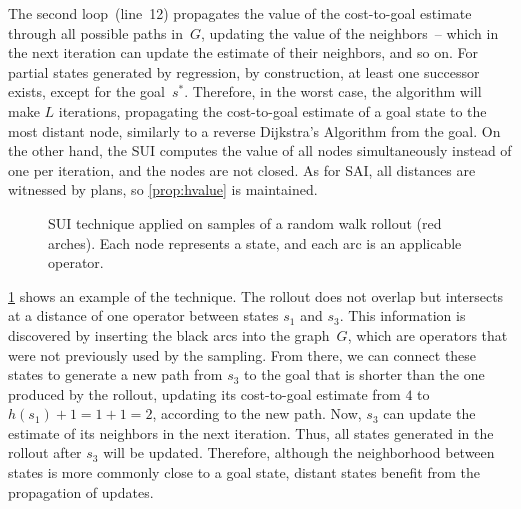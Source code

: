 The second loop~(line~12) propagates the value of the cost-to-goal estimate through all possible paths in~$G$, updating the value of the neighbors~-- which in the next iteration can update the estimate of their neighbors, and so on. For partial states generated by regression, by construction, at least one successor exists, except for the goal~$s^*$. Therefore, in the worst case, the algorithm will make $L$ iterations, propagating the cost-to-goal estimate of a goal state to the most distant node, similarly to a reverse Dijkstra's Algorithm from the goal. On the other hand, the SUI computes the value of all nodes simultaneously instead of one per iteration, and the nodes are not closed. As for SAI, all distances are witnessed by plans, so \cref{prop:hvalue} is maintained.

\begin{figure}[tb]
    \caption[SUI technique applied to samples of a random walk rollout.]{SUI technique applied on samples of a random walk rollout (red arches). Each node represents a state, and each arc is an applicable operator.}
    \label{fig:sui}
    \addmargin
    \centering
    
\end{figure}

\cref{fig:sui} shows an example of the technique. The rollout does not overlap but intersects at a distance of one operator between states $s_1$ and $s_3$. This information is discovered by inserting the black arcs into the graph~$G$, which are operators that were not previously used by the sampling. From there, we can connect these states to generate a new path from $s_3$ to the goal that is shorter than the one produced by the rollout, updating its cost-to-goal estimate from $4$ to $h(s_1)+1=1+1=2$, according to the new path. Now, $s_3$ can update the estimate of its neighbors in the next iteration. Thus, all states generated in the rollout after $s_3$ will be updated. Therefore, although the neighborhood between states is more commonly close to a goal state, distant states benefit from the propagation of updates.

